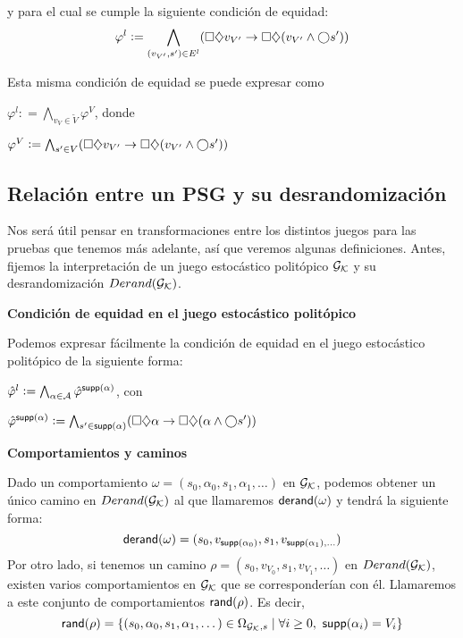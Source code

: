 y para el cual se cumple la siguiente condición de equidad: $$ \varphi^l :=
	\bigwedge_{(v_{V'},s') \in E^l} (\square \diamondsuit v_{V'} \rightarrow \square \diamondsuit
	(v_{V'} \wedge \bigcirc s' )) $$

Esta misma condición de equidad se puede expresar como

\begin{center}
	$ \varphi^l : = \bigwedge_{v_V \in \tilde V} \varphi^V $, donde

	$ \varphi^V := \bigwedge_{s' \in V} (\square \diamondsuit v_{V'} \rightarrow \square \diamondsuit (v_{V'} \wedge \bigcirc s' ))$
\end{center}

\subsection{Relación entre un PSG y su desrandomización}

Nos será útil pensar en transformaciones entre los distintos juegos para las
pruebas que tenemos más adelante, así que veremos algunas definiciones. Antes,
fijemos la interpretación de un juego estocástico politópico $\mathcal{G}_{\mathcal{K}}$ y su
desrandomización $Derand(\mathcal{G}_{\mathcal{K}})$.

\textbf{Condición de equidad en el juego estocástico politópico}

Podemos expresar fácilmente la condición de equidad en el juego estocástico
politópico de la siguiente forma:

\begin{center}
	$
		\hat \varphi^l := \bigwedge_{\alpha \in \mathcal{A}} \hat \varphi^{\textsf{supp}(\alpha)}
	$, con

	$
		\hat \varphi^{\textsf{supp}(\alpha)} := \bigwedge_{s' \in \textsf{supp}(\alpha)} (\square \diamondsuit \alpha \rightarrow \square \diamondsuit (\alpha \wedge \bigcirc s' ))
	$
\end{center}

\textbf{Comportamientos y caminos}

Dado un comportamiento $\omega = (s_0, \alpha_0, s_1, \alpha_1, \dots)$ en
$\mathcal{G}_{\mathcal{K}}$, podemos obtener un único camino en $Derand(\mathcal{G}_{\mathcal{K}})$ al que llamaremos
$\textsf{derand}(\omega)$ y tendrá la siguiente forma: $$\textsf{derand}(\omega) = (s_0,
	v_{\textsf{supp}(\alpha_0)}, s_1, v_{\textsf{supp}(\alpha_1), \dots})$$ Por otro lado, si
tenemos un camino $\rho = (s_0, v_{V_0}, s_1, v_{V_1}, \dots)$ en $Derand(\mathcal{G}_{\mathcal{K}})$,
existen varios comportamientos en $\mathcal{G}_{\mathcal{K}}$ que se corresponderían con él.
Llamaremos a este conjunto de comportamientos $\textsf{rand}(\rho)$. Es decir,
$$\textsf{rand}(\rho) = \{(s_0, \alpha_0, s_1, \alpha_1, \dots) \in \Omega_{\mathcal{G}_{\mathcal{K}},s} \mid
	\forall i \geq 0, \ \textsf{supp}(\alpha_i) = V_i\}$$

